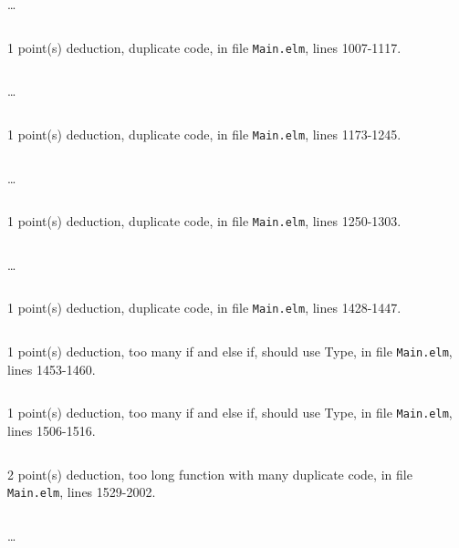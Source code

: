 \documentclass{article}
\begin{document}
\dots

\inputminted[firstline=996,lastline=1005]{elm}{Main.elm}

1 point(s) {\color{red}deduction}, duplicate code, in file {\color{blue}\texttt{Main.elm}}, lines {\color{blue}1007-1117}.

\inputminted[firstline=1007,lastline=1016]{elm}{Main.elm}

\dots

\inputminted[firstline=1108,lastline=1117]{elm}{Main.elm}

1 point(s) {\color{red}deduction}, duplicate code, in file {\color{blue}\texttt{Main.elm}}, lines {\color{blue}1173-1245}.

\inputminted[firstline=1173,lastline=1182]{elm}{Main.elm}

\dots

\inputminted[firstline=1236,lastline=1245]{elm}{Main.elm}

1 point(s) {\color{red}deduction}, duplicate code, in file {\color{blue}\texttt{Main.elm}}, lines {\color{blue}1250-1303}.

\inputminted[firstline=1250,lastline=1259]{elm}{Main.elm}

\dots

\inputminted[firstline=1294,lastline=1303]{elm}{Main.elm}

1 point(s) {\color{red}deduction}, duplicate code, in file {\color{blue}\texttt{Main.elm}}, lines {\color{blue}1428-1447}.

\inputminted[firstline=1428,lastline=1447]{elm}{Main.elm}

1 point(s) {\color{red}deduction}, too many if and else if, should use Type, in file {\color{blue}\texttt{Main.elm}}, lines {\color{blue}1453-1460}.

\inputminted[firstline=1453,lastline=1460]{elm}{Main.elm}

1 point(s) {\color{red}deduction}, too many if and else if, should use Type, in file {\color{blue}\texttt{Main.elm}}, lines {\color{blue}1506-1516}.

\inputminted[firstline=1506,lastline=1516]{elm}{Main.elm}

2 point(s) {\color{red}deduction}, too long function with many duplicate code, in file {\color{blue}\texttt{Main.elm}}, lines {\color{blue}1529-2002}.

\inputminted[firstline=1529,lastline=1538]{elm}{Main.elm}

\dots

\inputminted[firstline=1993,lastline=2002]{elm}{Main.elm}
\end{document}
